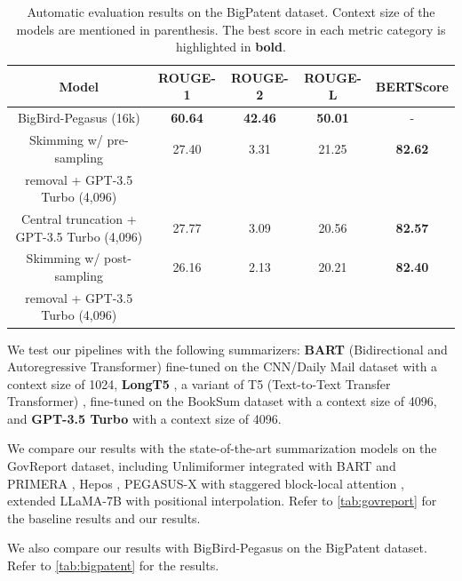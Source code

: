 	\begin{table}[!ht]
		\centering

		\begin{tabular}{c c c c c}
			\hline
			Model & ROUGE-1 & ROUGE-2 & ROUGE-L & BERTScore \\
			\hline
			BigBird-Pegasus (16k) & \textbf{60.64} & \textbf{42.46} & \textbf{50.01} & - \\
			\hline
			Skimming w/ pre-sampling & 27.40 & 3.31 & 21.25 & \textbf{82.62} \\
			removal + GPT-3.5 Turbo (4,096) & & & & \\
			Central truncation + GPT-3.5 Turbo (4,096) & 27.77 & 3.09 & 20.56 & \textbf{82.57} \\
			Skimming w/ post-sampling & 26.16 & 2.13 & 20.21 & \textbf{82.40} \\
			removal + GPT-3.5 Turbo (4,096) & & & & \\
			\hline
		\end{tabular}

		\caption{Automatic evaluation results on the BigPatent dataset. Context size of the models are
		mentioned in parenthesis. The best score in each metric category is highlighted in \textbf{bold}.}
		\label{tab:bigpatent}
	\end{table}

	We test our pipelines with the following summarizers: \textbf{BART} (Bidirectional
	and Autoregressive Transformer) \cite{lewis-etal-2020-bart} fine-tuned on the
	CNN/Daily Mail dataset \cite{nallapati2016abstractive} with a context size of 1024,
	\textbf{LongT5} \cite{guo2021longt5}, a variant of T5 (Text-to-Text Transfer
	Transformer) \cite{raffel2020exploring}, fine-tuned on the BookSum dataset with
	a context size of 4096, and \textbf{GPT-3.5 Turbo} \cite{brown2020language} with a
	context size of 4096.

	We compare our results with the state-of-the-art summarization models on the GovReport dataset,
	including Unlimiformer \cite{bertsch2023unlimiformer} integrated with BART \cite{lewis-etal-2020-bart}
	and PRIMERA \cite{beltagy2020longformer}, Hepos \cite{huang-etal-2021-efficient},
	PEGASUS-X with staggered block-local attention \cite{phang2022investigating}, extended
	LLaMA-7B with positional interpolation.
	Refer to \autoref{tab:govreport} for the baseline results and our results.

	We also compare our results with BigBird-Pegasus \cite{zaheer2020big} on the BigPatent dataset.
	Refer to \autoref{tab:bigpatent} for the results.


